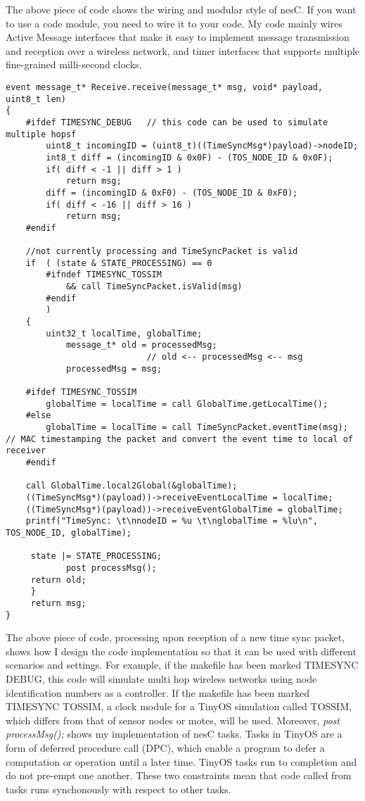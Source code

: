 \documentclass[a4paper,10pt]{report}
\begin{document}
\vspace{0.2cm}
The above piece of code shows the wiring and modular style of nesC. If you want to use a code module, you need to wire it to your code. My code mainly wires Active Message interfaces that make it easy to implement message transmission and reception over a wireless network, and timer interfaces that supports multiple fine-grained milli-second clocks. 

\vspace{0.2cm}
\begin{lstlisting}
event message_t* Receive.receive(message_t* msg, void* payload, uint8_t len)
{
	#ifdef TIMESYNC_DEBUG   // this code can be used to simulate multiple hopsf
        uint8_t incomingID = (uint8_t)((TimeSyncMsg*)payload)->nodeID;
        int8_t diff = (incomingID & 0x0F) - (TOS_NODE_ID & 0x0F);
        if( diff < -1 || diff > 1 )
            return msg;
        diff = (incomingID & 0xF0) - (TOS_NODE_ID & 0xF0);
        if( diff < -16 || diff > 16 )
            return msg;
	#endif
	
	//not currently processing and TimeSyncPacket is valid
	if	( (state & STATE_PROCESSING) == 0         
		#ifndef TIMESYNC_TOSSIM	
        	&& call TimeSyncPacket.isValid(msg) 
		#endif
		)
	{
	    uint32_t localTime, globalTime; 
       	    message_t* old = processedMsg;
							// old <-- processedMsg <-- msg
       	    processedMsg = msg;

	#ifdef TIMESYNC_TOSSIM
	    globalTime = localTime = call GlobalTime.getLocalTime();
	#else
	    globalTime = localTime = call TimeSyncPacket.eventTime(msg);	// MAC timestamping the packet and convert the event time to local of receiver
	#endif
       	    
    call GlobalTime.local2Global(&globalTime);
	((TimeSyncMsg*)(payload))->receiveEventLocalTime = localTime;
    ((TimeSyncMsg*)(payload))->receiveEventGlobalTime = globalTime;
	printf("TimeSync: \t\nnodeID = %u \t\nglobalTime = %lu\n", TOS_NODE_ID, globalTime);
  	
  	 state |= STATE_PROCESSING;
     	    post processMsg(); 	   
     return old; 
     } 
     return msg;
}
\end{lstlisting}

\vspace{0.2cm}
The above piece of code, processing upon reception of a new time sync packet, shows how I design the code implementation so that it can be used with different scenarios and settings. For example, if the makefile has been marked TIMESYNC \space DEBUG, this code will simulate multi hop wireless networks using node identification numbers as a controller. If the makefile has been marked TIMESYNC \space TOSSIM, a clock module for a TinyOS simulation called TOSSIM, which differs from that of sensor nodes or motes, will be used. Moreover, \textit{post processMsg(); } shows my implementation of nesC tasks. Tasks in TinyOS are a form of deferred procedure call (DPC), which enable a program to defer a computation or operation until a later time. TinyOS tasks run to completion and do not pre-empt one another. These two constraints mean that code called from tasks runs synchonously with respect to other tasks.
\end{document}
